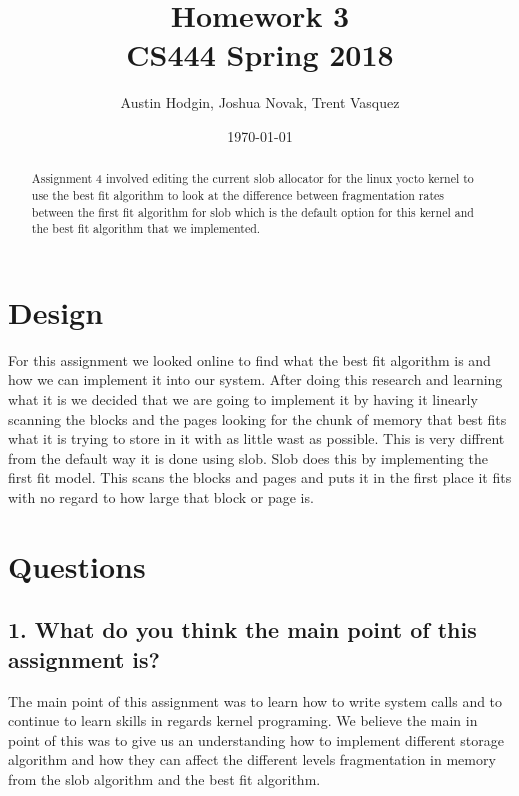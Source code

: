 \documentclass[onecolumn, draftclsnofoot,10pt, compsoc]{IEEEtran}
\title{Homework 3\\\large CS444 Spring 2018 }
\author{Austin Hodgin, Joshua Novak, Trent Vasquez}
\date{\today}
\begin{document}
	\begin{titlingpage}
		\maketitle
		\begin{abstract}
			\noindent Assignment 4 involved editing the current slob allocator for the linux yocto kernel to use the best
			fit algorithm to look at the difference between fragmentation rates between the first fit algorithm for slob which 
			is the default option for this kernel and the best fit algorithm that we implemented. 
		\end{abstract}
	\end{titlingpage}


	\section*{Design}
	For this assignment we looked online to find what the best fit algorithm is and how we can implement it into our system.
	After doing this research and learning what it is we decided that we are going to implement it by having it linearly scanning the blocks and 
	the pages looking for the chunk of memory that best fits what it is trying to store in it with as little wast as possible. This is very diffrent from 
	the default way it is done using slob. Slob does this by implementing the first fit model. This scans the blocks and pages and puts it in the 
	first place it fits with no regard to how large that block or page is.  
	
	\section*{Questions}
	\subsection*{1. What do you think the main point of this assignment is?}
	\noindent The main point of this assignment was to learn how to write system calls and to continue to learn 
	skills in regards kernel programing. We believe the main in point of this was to give us an understanding how
	to implement different storage algorithm and how they can affect the different levels fragmentation in memory from 
	the slob algorithm and the best fit algorithm. 
\end{document}

